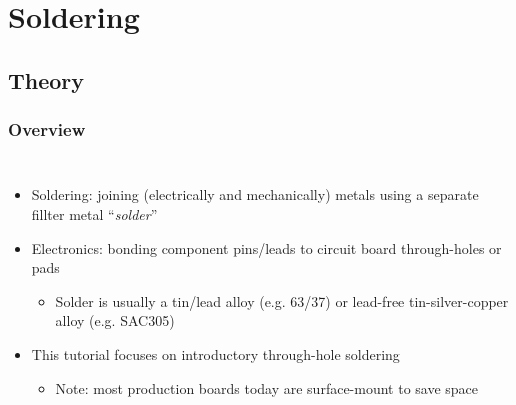 \documentclass{beamer}
\begin{document}
\section{Soldering} %
\subsection{Theory}
\begin{frame}
\frametitle{Overview}
\begin{columns}[t]
\begin{itemize}
  \item Soldering: joining (electrically and mechanically) metals using a separate fillter metal ``\textit{solder}''
  \item Electronics: bonding component pins/leads to circuit board through-holes or pads
  \begin{itemize}
    \item Solder is usually a tin/lead alloy (e.g. 63/37) or lead-free tin-silver-copper alloy (e.g. SAC305)
  \end{itemize}
  \item This tutorial focuses on introductory through-hole soldering
  \begin{itemize}
    \item Note: most production boards today are surface-mount to save space
  \end{itemize}
\end{itemize}


\end{columns}
\end{frame}
\end{document}

